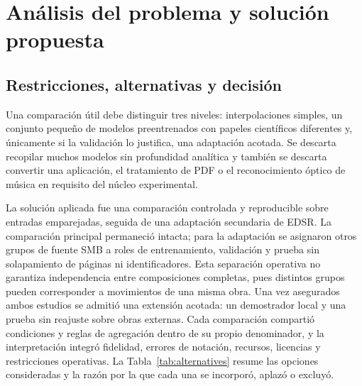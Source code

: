 \chapter{Análisis del problema y solución propuesta}

\section{Restricciones, alternativas y decisión}
Una comparación útil debe distinguir tres niveles: interpolaciones simples, un conjunto pequeño de
modelos preentrenados con papeles científicos diferentes y, únicamente si la validación lo
justifica, una adaptación acotada. Se descarta recopilar muchos modelos sin profundidad analítica y
también se descarta convertir una aplicación, el tratamiento de PDF o el reconocimiento óptico de
música en requisito del núcleo experimental.

La solución aplicada fue una comparación controlada y reproducible sobre entradas emparejadas,
seguida de una adaptación secundaria de EDSR. La comparación principal permaneció intacta; para la
adaptación se asignaron otros grupos de fuente SMB a roles de entrenamiento, validación y prueba
sin solapamiento de páginas ni identificadores. Esta separación operativa no garantiza independencia
entre composiciones completas, pues distintos grupos pueden corresponder a movimientos de una
misma obra. Una vez asegurados ambos estudios se admitió una extensión acotada: un demostrador
local y una prueba sin reajuste sobre obras externas. Cada comparación compartió condiciones y
reglas de agregación dentro de su propio denominador, y la interpretación integró fidelidad,
errores de notación, recursos, licencias y restricciones operativas.
La Tabla~\ref{tab:alternatives} resume las opciones consideradas y la razón por la que cada una se
incorporó, aplazó o excluyó.

